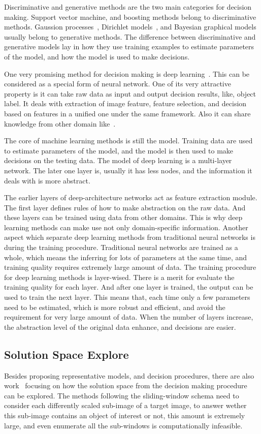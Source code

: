 Discriminative and generative methods are the two main categories for decision making.
Support vector machine, and boosting methods belong to discriminative methods. Gaussion processes~\cite{gprocess}, Dirichlet models~\cite{lda,dp,hdp}, and Bayesian graphical models~\cite{bgm} usually belong to generative methods. The difference between discriminative and generative models lay in how they use training examples to estimate parameters of the model, and how the model is used to make decisions.

One very promising method for decision making is deep learning~\cite{dlearn}. This can be considered as a special form of neural network. One of its very attractive property is it can take raw data as input and output decision results, like, object label. It deals with extraction of image feature, feature selection, and decision based on features in a unified one under the same framework. Also it can share knowledge from other domain like~\cite{tlsurvey}.

The core of machine learning methods is still the model. Training data are used to estimate  parameters of the model, and the model is then used to make decisions on the testing data. The model of deep learning is a multi-layer network. The later one layer is, usually it has less nodes, and the information it deals with is more abstract.

The earlier layers of deep-architecture networks act as feature extraction module. The first layer defines rules of how to make abstraction on the raw data. And these layers can be trained using  data from other domains. This is why deep learning methods can make use not only domain-specific information. Another aspect which separate deep learning methods from traditional neural networks is during the training procedure. Traditional neural networks are trained as a whole, which means the inferring for lots of parameters at the same time, and training quality  requires extremely large amount of data. The training procedure for deep learning methods is layer-wised. There is a merit for evaluate the training quality for each layer. And after one layer is trained, the output can be used to train the next layer. This means that, each time only a few parameters need to be estimated, which is more robust and efficient, and avoid the requirement for very large amount of data. When the number of layers increase, the abstraction level of the original data enhance, and decisions are easier.


\subsection{Solution Space Explore}
Besides proposing representative models, and decision procedures, there are also work~\cite{408,spm,ciod} focusing on how the solution space from the decision making procedure can be explored. The methods following the sliding-window schema need to consider each differently scaled sub-image of a target image, to answer wether this sub-image contains an object of interest or not, this amount is extremely large, and even enumerate all the sub-windows is computationally infeasible.

